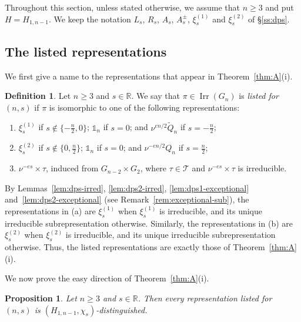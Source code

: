 \documentclass[11pt]{amsart}
\numberwithin{equation}{section}
\theoremstyle{plain}
\newtheorem{proposition}[theorem]{Proposition}
\theoremstyle{definition}
\newtheorem{definition}[theorem]{Definition}
\theoremstyle{remark}
\newcommand{\R}{\mathbb{R}}
\newcommand{\one}{\mathds{1}}
\newcommand{\T}{\mathcal{T}}
\DeclareMathOperator{\Irr}{Irr}
\newcommand{\Qt}{\widetilde{Q}}
\newcommand{\xione}{\xi^{(1)}}
\newcommand{\xitwo}{\xi^{(2)}}
\begin{document}
Throughout this section, unless stated otherwise, we assume that $n\ge3$ and put $H=H_{1,n-1}$. We keep the notation $L_s$, $R_s$, $A_s$, $A_s^\pm$, $\xione_s$ and $\xitwo_s$ of \S\ref{ss:dps}.

\subsection{The listed representations}\label{ss:listed}

We first give a name to the representations that appear in Theorem~\ref{thm:A}(i).

\begin{definition}\label{def:listed}
	Let $n\ge3$ and $s\in\R$. We say that $\pi\in\Irr(G_n)$ is \emph{listed for $(n,s)$} if $\pi$ is isomorphic to one of the following representations:
	\begin{enumerate}[label=\textup{(\alph*)}]
		\item $\xione_s$ if $s\notin\{-\frac n2,0\}$; $\one_n$ if $s=0$; and $\nu^{en/2}\Qt_n$ if $s=-\frac n2$;
		\item $\xitwo_s$ if $s\notin\{0,\frac n2\}$; $\one_n$ if $s=0$; and $\nu^{-en/2}Q_n$ if $s=\frac n2$;
		\item $\nu^{-es}\times\tau$, induced from $G_{n-2}\times G_2$, where $\tau\in\T$ and $\nu^{-es}\times\tau$ is irreducible.
	\end{enumerate}
\end{definition}

By Lemmas~\ref{lem:dps-irred}, \ref{lem:dps2-irred}, \ref{lem:dps1-exceptional} and~\ref{lem:dps2-exceptional} (see Remark~\ref{rem:exceptional-sub}), the representations in (a) are $\xione_s$ when $\xione_s$ is irreducible, and its unique irreducible subrepresentation otherwise. Similarly, the representations in (b) are $\xitwo_s$ when $\xitwo_s$ is irreducible, and its unique irreducible subrepresentation otherwise. Thus, the listed representations are exactly those of Theorem~\ref{thm:A}(i).

We now prove the easy direction of Theorem~\ref{thm:A}(i).

\begin{proposition}\label{prop:listed-dist}
	Let $n\ge3$ and $s\in\R$. Then every representation listed for $(n,s)$ is $(H_{1,n-1},\chi_s)$-distinguished.
\end{proposition}
\end{document}

